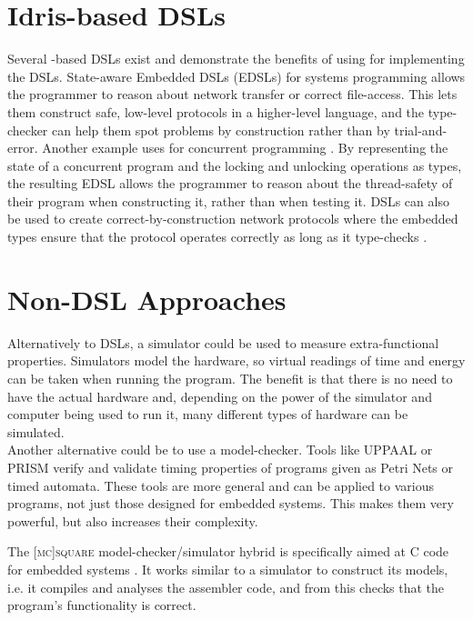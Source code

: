 \section{Idris-based DSLs}
	Several \Idris-based DSLs exist and demonstrate the benefits of using \Idris for implementing the DSLs. State-aware Embedded DSLs (EDSLs) for systems programming \cite{10.1007/978-3-642-27694-1_18} allows the programmer to reason about network transfer or correct file-access. This lets them construct safe, low-level protocols in a higher-level language, and the type-checker can help them spot problems by construction \cite{10.1007/978-3-642-27694-1_18} rather than by trial-and-error.
	Another example uses \Idris for concurrent programming \cite{brady2010correct}. By representing the state of a concurrent program and the locking and unlocking operations as types, the resulting EDSL allows the programmer to reason about the thread-safety of their program when constructing it, rather than when testing it.
	DSLs can also be used to create correct-by-construction network protocols where the embedded types ensure that the protocol operates correctly as long as it type-checks \cite{5158855}.


\section{Non-DSL Approaches}
	Alternatively to DSLs, a simulator could be used to measure extra-functional properties. Simulators model the hardware, so virtual readings of time and energy can be taken when running the program. The benefit is that there is no need to have the actual hardware and, depending on the power of the simulator and computer being used to run it, many different types of hardware can be simulated.
    \\
    
    Another alternative could be to use a model-checker. Tools like UPPAAL \cite{Larsen1997} or PRISM \cite{10.1007/978-3-642-22110-1_47} verify and validate timing properties of programs given as Petri Nets or timed automata. These tools are more general and can be applied to various programs, not just those designed for embedded systems. This makes them very powerful, but also increases their complexity.
    
    The \textsc{[mc]square} model-checker/simulator hybrid is specifically aimed at C code for embedded systems \cite{Schlich2009}. It works similar to a simulator to construct its models, i.e. it compiles and analyses the assembler code, and from this checks that the program's functionality is correct.


